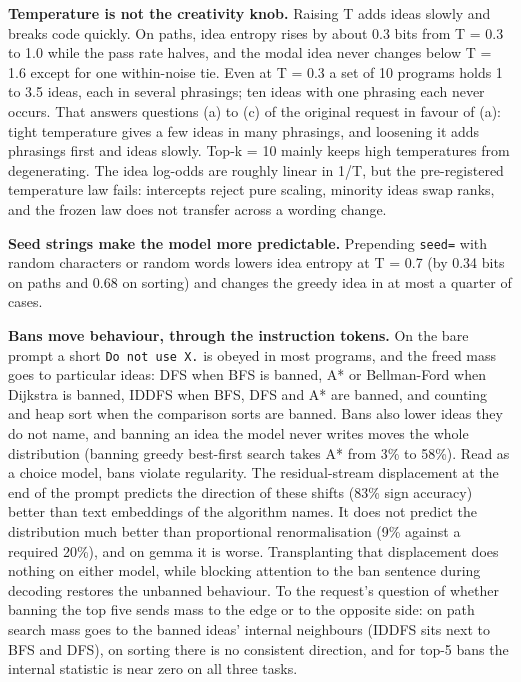 \documentclass[11pt,letterpaper]{article}
\begin{document}
\textbf{Temperature is not the creativity knob.} Raising T adds ideas slowly and breaks code quickly. On paths, idea entropy rises by about 0.3 bits from T = 0.3 to 1.0 while the pass rate halves, and the modal idea never changes below T = 1.6 except for one within-noise tie. Even at T = 0.3 a set of 10 programs holds 1 to 3.5 ideas, each in several phrasings; ten ideas with one phrasing each never occurs. That answers questions (a) to (c) of the original request in favour of (a): tight temperature gives a few ideas in many phrasings, and loosening it adds phrasings first and ideas slowly. Top-k = 10 mainly keeps high temperatures from degenerating. The idea log-odds are roughly linear in 1/T, but the pre-registered temperature law fails: intercepts reject pure scaling, minority ideas swap ranks, and the frozen law does not transfer across a wording change.

\textbf{Seed strings make the model more predictable.} Prepending \texttt{seed=\allowbreak{}} with random characters or random words lowers idea entropy at T = 0.7 (by 0.34 bits on paths and 0.68 on sorting) and changes the greedy idea in at most a quarter of cases.

\textbf{Bans move behaviour, through the instruction tokens.} On the bare prompt a short \texttt{Do\ not\ use\ X.} is obeyed in most programs, and the freed mass goes to particular ideas: DFS when BFS is banned, A* or Bellman-Ford when Dijkstra is banned, IDDFS when BFS, DFS and A* are banned, and counting and heap sort when the comparison sorts are banned. Bans also lower ideas they do not name, and banning an idea the model never writes moves the whole distribution (banning greedy best-first search takes A* from 3\% to 58\%). Read as a choice model, bans violate regularity. The residual-stream displacement at the end of the prompt predicts the direction of these shifts (83\% sign accuracy) better than text embeddings of the algorithm names. It does not predict the distribution much better than proportional renormalisation (9\% against a required 20\%), and on gemma it is worse. Transplanting that displacement does nothing on either model, while blocking attention to the ban sentence during decoding restores the unbanned behaviour. To the request's question of whether banning the top five sends mass to the edge or to the opposite side: on path search mass goes to the banned ideas' internal neighbours (IDDFS sits next to BFS and DFS), on sorting there is no consistent direction, and for top-5 bans the internal statistic is near zero on all three tasks.
\end{document}
